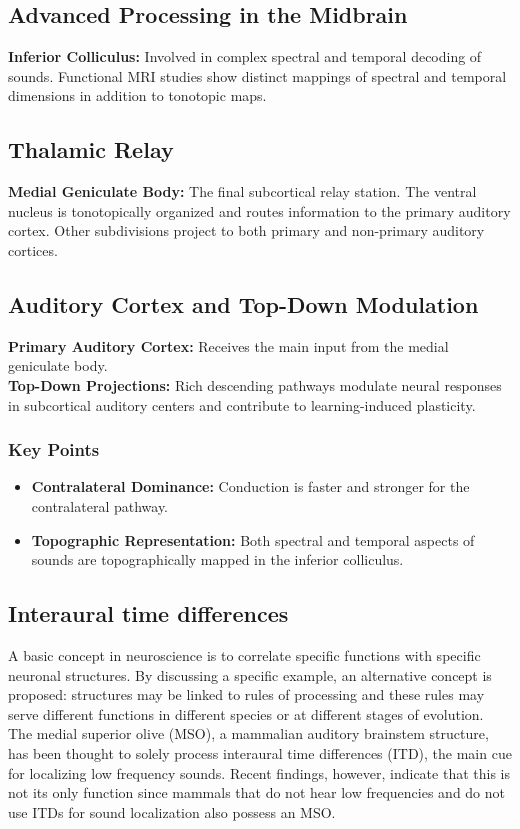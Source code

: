 \documentclass{article}
\begin{document}
\subsection{Advanced Processing in the Midbrain}
\textbf{Inferior Colliculus:} Involved in complex spectral and temporal decoding of sounds. Functional MRI studies show distinct mappings of spectral and temporal dimensions in addition to tonotopic maps.

\subsection{Thalamic Relay}
\textbf{Medial Geniculate Body:} The final subcortical relay station. The ventral nucleus is tonotopically organized and routes information to the primary auditory cortex. Other subdivisions project to both primary and non-primary auditory cortices.
\subsection{Auditory Cortex and Top-Down Modulation}
\textbf{Primary Auditory Cortex:} Receives the main input from the medial geniculate body. \\
\textbf{Top-Down Projections:} Rich descending pathways modulate neural responses in subcortical auditory centers and contribute to learning-induced plasticity.

\subsubsection{Key Points}
\begin{itemize}
    \item \textbf{Contralateral Dominance:} Conduction is faster and stronger for the contralateral pathway.
    \item \textbf{Topographic Representation:} Both spectral and temporal aspects of sounds are topographically mapped in the inferior colliculus.
\end{itemize}

\subsection{Interaural time differences}

A basic concept in neuroscience is to correlate specific functions with specific neuronal structures. By discussing a specific example, an alternative concept is proposed: structures may be linked to rules of processing and these rules may serve different functions in different species or at different stages of evolution. The medial superior olive (MSO), a mammalian auditory brainstem structure, has been thought to solely process interaural time differences (ITD), the main cue for localizing low frequency sounds. Recent findings, however, indicate that this is not its only function since mammals that do not hear low frequencies and do not use ITDs for sound localization also possess an MSO.
\end{document}
